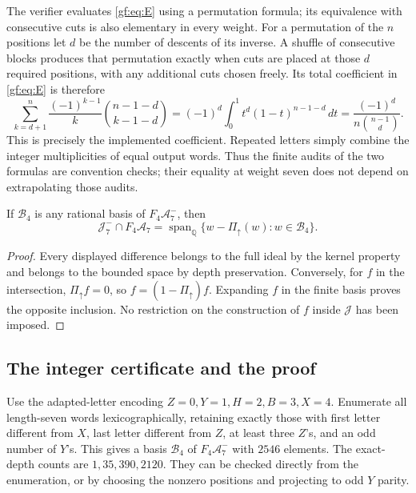 The verifier evaluates \eqref{gf:eq:E} using a permutation formula; its
equivalence with consecutive cuts is also elementary in every weight.
For a permutation of the $n$ positions let $d$ be the number of descents
of its inverse. A shuffle of consecutive blocks produces that permutation
exactly when cuts are placed at those $d$ required positions, with any
additional cuts chosen freely. Its total coefficient in \eqref{gf:eq:E}
is therefore
\[
 \sum_{k=d+1}^n\frac{(-1)^{k-1}}k
      \binom{n-1-d}{k-1-d}
   =(-1)^d\int_0^1 t^d(1-t)^{n-1-d}\,dt
   =\frac{(-1)^d}{n\binom{n-1}{d}}.
\]
This is precisely the implemented coefficient. Repeated letters simply
combine the integer multiplicities of equal output words. Thus the
finite audits of the two formulas are convention checks; their equality
at weight seven does not depend on extrapolating those audits.

\begin{lemma}
\label{gf:lem:intersection}
If $\mathcal B_4$ is any rational basis of $F_4\mathcal A_7^-$, then
\[
 \mathcal J_7^-\cap F_4\mathcal A_7
   =\operatorname{span}_{\mathbb Q}
       \{w-\Pi_{\uparrow}(w):w\in\mathcal B_4\}.
\]
\end{lemma}
\begin{proof}
Every displayed difference belongs to the full ideal by the kernel
property and belongs to the bounded space by depth preservation.
Conversely, for $f$ in the intersection, $\Pi_{\uparrow}f=0$, so
$f=(1-\Pi_{\uparrow})f$. Expanding $f$ in the finite basis proves the
opposite inclusion. No restriction on the construction of $f$ inside
$\mathcal J$ has been imposed.
\end{proof}

\subsection{The integer certificate and the proof}

Use the adapted-letter encoding $Z=0,Y=1,H=2,B=3,X=4$. Enumerate all
length-seven words lexicographically, retaining exactly those with first
letter different from $X$, last letter different from $Z$, at least three
$Z$'s, and an odd number of $Y$'s. This gives a basis $\mathcal B_4$ of
$F_4\mathcal A_7^-$ with $2546$ elements. The exact-depth counts are
$1,35,390,2120$. They can be checked directly from the enumeration, or
by choosing the nonzero positions and projecting to odd $Y$ parity.

